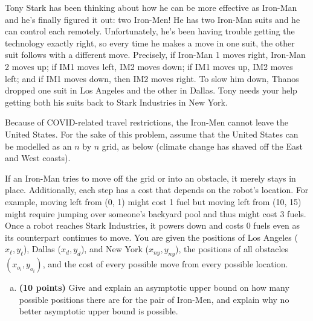 \documentclass[11pt,letterpaper]{article}
\begin{document}
\pagebreak
\begin{problem}
    Tony Stark has been thinking about how he can be more effective as Iron-Man and he's finally figured it out: two Iron-Men! He has two Iron-Man suits and he can control each remotely. Unfortunately, he's been having trouble getting the technology exactly right, so every time he makes a move in one suit, the other suit follows with a different move. Precisely, if Iron-Man 1 moves right, Iron-Man 2 moves up; if IM1 moves left, IM2 moves down; if IM1 moves up, IM2 moves left; and if IM1 moves down, then IM2 moves right. To slow him down, Thanos dropped one suit in Los Angeles and the other in Dallas. Tony needs your help getting both his suits back to Stark Industries in New York. 
 
    Because of COVID-related travel restrictions, the Iron-Men cannot leave the United States. For the sake of this problem, assume that the United States can be modelled as an $n$ by $n$ grid, as below (climate change has shaved off the East and West coasts). 
 
    \begin{center}
    \end{center}

    If an Iron-Man tries to move off the grid or into an obstacle, it merely stays in place. Additionally, each step has a cost that depends on the robot's location. For example, moving left from (0, 1) might cost 1 fuel but moving left from (10, 15) might require jumping over someone's backyard pool and thus might cost 3 fuels.  Once a robot reaches Stark Industries, it powers down and costs 0 fuels even as its counterpart continues to move. You are given the positions of Los Angeles ($x_\ell, y_\ell$), Dallas ($x_d, y_d$), and New York ($x_{ny}, y_{ny}$), the positions of all obstacles $(x_{o_i}, y_{o_i})$, and the cost of every possible move from every possible location.

    \begin{enumerate}[(a)]
        \item {\bf (10 points)} Give and explain an asymptotic upper bound on how many possible positions there are for the pair of Iron-Men, and explain why no better asymptotic upper bound is possible.
        

\end{enumerate}
\end{problem}
\end{document}
